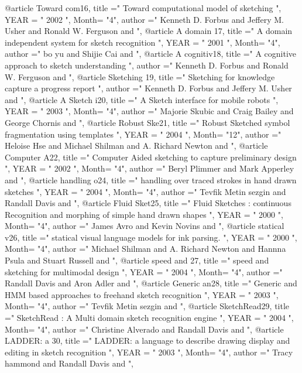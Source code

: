 @article{ Toward com16, 
  title ="  Toward computational model of sketching   ", 
 YEAR = " 2002  ",
Month= "4",
 author =" Kenneth D. Forbus   and  Jeffery M.  Usher   and  Ronald W. Ferguson   and  ",
}
@article{ A domain  17, 
  title ="  A domain  independent system for sketch recognition   ", 
 YEAR = " 2001  ",
Month= "4",
 author =" bo yu   and  Shijie Cai   and  ",
}
@article{ A cognitiv18, 
  title ="  A cognitive approach to sketch understanding  ", 
 author =" Kenneth D. Forbus   and  Ronald W. Ferguson   and  ",
}
@article{ Sketching 19, 
  title ="  Sketching for knowledge capture a progress report  ", 
 author =" Kenneth D. Forbus   and  Jeffery M.  Usher   and  ",
}
@article{ A Sketch i20, 
  title ="  A Sketch interface for mobile robots  ", 
 YEAR = " 2003  ",
Month= "4",
 author =" Majorie Skubic    and  Craig Bailey   and  George Chornis   and  ",
}
@article{ Robust Ske21, 
  title ="  Robust Sketched symbol fragmentation using templates  ", 
 YEAR = " 2004  ",
Month= "12",
 author =" Heloise Hse   and  Michael Shilman   and  A. Richard Newton   and  ",
}
@article{ Computer A22, 
  title ="  Computer Aided sketching to capture preliminary design  ", 
 YEAR = " 2002  ",
Month= "4",
 author =" Beryl Plimmer   and  Mark Apperley   and  ",
}
@article{ handling o24, 
  title ="  handling over traced strokes in hand drawn sketches  ", 
 YEAR = " 2004  ",
Month= "4",
 author =" Tevfik Metin sezgin   and  Randall Davis   and  ",
}
@article{ Fluid Sket25, 
  title ="  Fluid Sketches : continuous Recognition and morphing of simple hand drawn shapes  ", 
 YEAR = " 2000  ",
Month= "4",
 author =" James Avro    and  Kevin Novins   and  ",
}
@article{ statical v26, 
  title ="  statical visual language models for ink parsing.  ", 
 YEAR = " 2000  ",
Month= "4",
 author =" Michael Shilman   and  A. Richard Newton   and  Hannna Psula    and  Stuart Russell   and  ",
}
@article{ speed and 27, 
  title ="  speed and sketching for multimodal design  ", 
 YEAR = " 2004  ",
Month= "4",
 author =" Randall Davis   and  Aron Adler   and  ",
}
@article{ Generic an28, 
  title ="  Generic and HMM based approaches to freehand sketch recognition  ", 
 YEAR = " 2003  ",
Month= "4",
 author =" Tevfik Metin sezgin   and  ",
}
@article{ SketchRead29, 
  title ="  SketchRead : A Multi domain sketch recognition engine  ", 
 YEAR = " 2004  ",
Month= "4",
 author =" Christine Alverado   and  Randall Davis   and  ",
}
@article{ LADDER: a 30, 
  title ="  LADDER: a language to describe drawing display and editing in sketch recognition  ", 
 YEAR = " 2003  ",
Month= "4",
 author =" Tracy hammond   and  Randall Davis   and  ",
}
